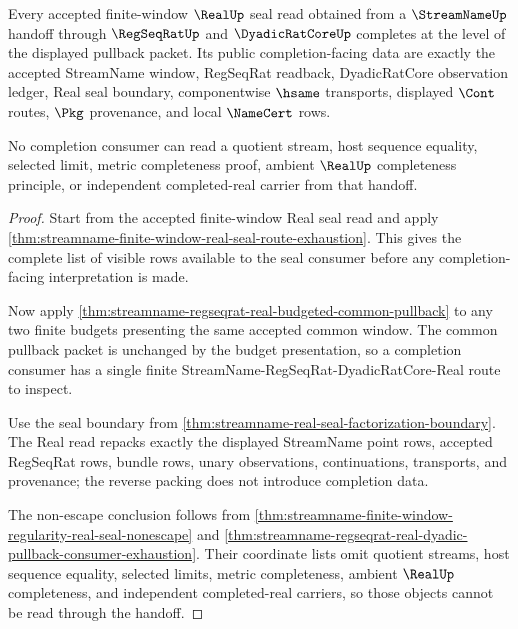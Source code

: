 \begin{theorem}
\label{thm:streamname-real-handoff-completion-nonescape}
Every accepted finite-window $\RealUp$ seal read obtained from a $\StreamNameUp$ handoff through $\RegSeqRatUp$ and $\DyadicRatCoreUp$ completes at the level of the displayed pullback packet. Its public completion-facing data are exactly the accepted StreamName window, RegSeqRat readback, DyadicRatCore observation ledger, Real seal boundary, componentwise $\hsame$ transports, displayed $\Cont$ routes, $\Pkg$ provenance, and local $\NameCert$ rows.

No completion consumer can read a quotient stream, host sequence equality, selected limit, metric completeness proof, ambient $\RealUp$ completeness principle, or independent completed-real carrier from that handoff.
\end{theorem}
\begin{proof}
Start from the accepted finite-window Real seal read and apply \autoref{thm:streamname-finite-window-real-seal-route-exhaustion}. This gives the complete list of visible rows available to the seal consumer before any completion-facing interpretation is made.

Now apply \autoref{thm:streamname-regseqrat-real-budgeted-common-pullback} to any two finite budgets presenting the same accepted common window. The common pullback packet is unchanged by the budget presentation, so a completion consumer has a single finite StreamName-RegSeqRat-DyadicRatCore-Real route to inspect.

Use the seal boundary from \autoref{thm:streamname-real-seal-factorization-boundary}. The Real read repacks exactly the displayed StreamName point rows, accepted RegSeqRat rows, bundle rows, unary observations, continuations, transports, and provenance; the reverse packing does not introduce completion data.

The non-escape conclusion follows from \autoref{thm:streamname-finite-window-regularity-real-seal-nonescape} and \autoref{thm:streamname-regseqrat-real-dyadic-pullback-consumer-exhaustion}. Their coordinate lists omit quotient streams, host sequence equality, selected limits, metric completeness, ambient $\RealUp$ completeness, and independent completed-real carriers, so those objects cannot be read through the handoff.
\end{proof}

